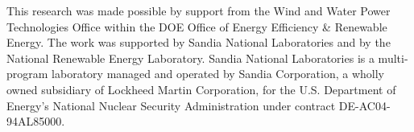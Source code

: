 \documentclass[twocolumn,10pt]{asme2e}
\begin{document}
\begin{acknowledgment}

This research was made possible by support from the Wind and Water Power Technologies Office within the DOE Office of Energy Efficiency \& Renewable Energy. The work was supported by Sandia National Laboratories and by the National Renewable Energy Laboratory. Sandia National Laboratories is a multi-program laboratory managed and operated by Sandia Corporation, a wholly owned subsidiary of Lockheed Martin Corporation, for the U.S. Department of Energy’s National Nuclear Security Administration under contract DE-AC04-94AL85000.

\end{acknowledgment}




%


\end{document}
